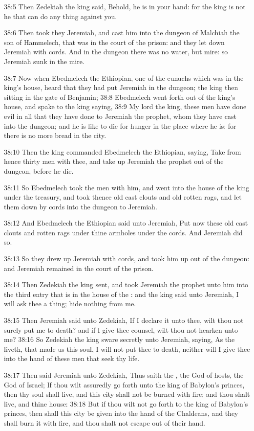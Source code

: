 38:5 Then Zedekiah the king said, Behold, he is in your hand: for the king is not he that can do any thing against you.

38:6 Then took they Jeremiah, and cast him into the dungeon of Malchiah the son of Hammelech, that was in the court of the prison: and they let down Jeremiah with cords. And in the dungeon there was no water, but mire: so Jeremiah sunk in the mire.

38:7 Now when Ebedmelech the Ethiopian, one of the eunuchs which was in the king's house, heard that they had put Jeremiah in the dungeon; the king then sitting in the gate of Benjamin; 38:8 Ebedmelech went forth out of the king's house, and spake to the king saying, 38:9 My lord the king, these men have done evil in all that they have done to Jeremiah the prophet, whom they have cast into the dungeon; and he is like to die for hunger in the place where he is: for there is no more bread in the city.

38:10 Then the king commanded Ebedmelech the Ethiopian, saying, Take from hence thirty men with thee, and take up Jeremiah the prophet out of the dungeon, before he die.

38:11 So Ebedmelech took the men with him, and went into the house of the king under the treasury, and took thence old cast clouts and old rotten rags, and let them down by cords into the dungeon to Jeremiah.

38:12 And Ebedmelech the Ethiopian said unto Jeremiah, Put now these old cast clouts and rotten rags under thine armholes under the cords.  And Jeremiah did so.

38:13 So they drew up Jeremiah with cords, and took him up out of the dungeon: and Jeremiah remained in the court of the prison.

38:14 Then Zedekiah the king sent, and took Jeremiah the prophet unto him into the third entry that is in the house of the \LORD: and the king said unto Jeremiah, I will ask thee a thing; hide nothing from me.

38:15 Then Jeremiah said unto Zedekiah, If I declare it unto thee, wilt thou not surely put me to death? and if I give thee counsel, wilt thou not hearken unto me?  38:16 So Zedekiah the king sware secretly unto Jeremiah, saying, As the \LORD liveth, that made us this soul, I will not put thee to death, neither will I give thee into the hand of these men that seek thy life.

38:17 Then said Jeremiah unto Zedekiah, Thus saith the \LORD, the God of hosts, the God of Israel; If thou wilt assuredly go forth unto the king of Babylon's princes, then thy soul shall live, and this city shall not be burned with fire; and thou shalt live, and thine house: 38:18 But if thou wilt not go forth to the king of Babylon's princes, then shall this city be given into the hand of the Chaldeans, and they shall burn it with fire, and thou shalt not escape out of their hand.

